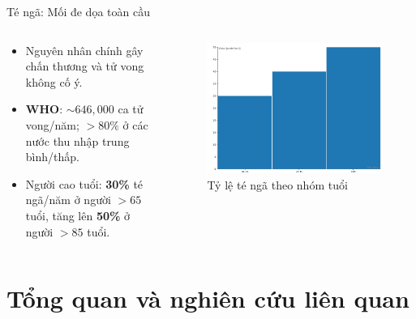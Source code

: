 \begin{frame}{Té ngã: Mối đe dọa toàn cầu}
    \begin{columns}[T]
        \begin{column}{0.48\textwidth}
            \begin{itemize}
                \item Nguyên nhân chính gây chấn thương và tử vong không cố ý.
                \item \textbf{WHO}: $\sim646,000$ ca tử vong/năm; $>80\%$ ở các nước thu nhập trung bình/thấp.
                \item Người cao tuổi: \textbf{30\%} té ngã/năm ở người $>65$ tuổi, tăng lên \textbf{50\%} ở người $>85$ tuổi.
            \end{itemize}
        \end{column}
        \begin{column}{0.48\textwidth}
            \begin{figure}
                \centering
                \includegraphics[width=\textwidth]{images/fall_status_who.png}
                \caption{Tỷ lệ té ngã theo nhóm tuổi}
            \end{figure}
        \end{column}
    \end{columns}
\end{frame}

\section{Tổng quan và nghiên cứu liên quan}


